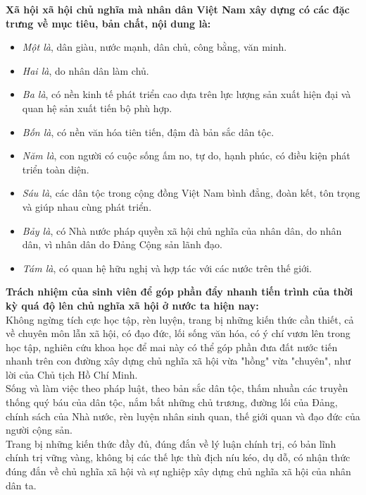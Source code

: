 \textbf{Xã hội xã hội chủ nghĩa mà nhân dân Việt Nam xây dựng có các đặc trưng về mục tiêu, bản chất, nội dung là:} \supercite{vk11}
\begin{itemize}
\item \textit{Một là}, dân giàu, nước mạnh, dân chủ, công bằng, văn minh.
\item \textit{Hai là}, do nhân dân làm chủ.
\item \textit{Ba là}, có nền kinh tế phát triển cao dựa trên lực lượng sản xuất hiện đại và quan hệ sản xuất tiến bộ phù hợp.
\item \textit{Bốn là}, có nền văn hóa tiên tiến, đậm đà bản sắc dân tộc.
\item \textit{Năm là}, con người có cuộc sống ấm no, tự do, hạnh phúc, có điều kiện phát triển toàn diện.
\item \textit{Sáu là}, các dân tộc trong cộng đồng Việt Nam bình đẳng, đoàn kết, tôn trọng và giúp nhau cùng phát triển.
\item \textit{Bảy là}, có Nhà nước pháp quyền xã hội chủ nghĩa của nhân dân, do nhân dân, vì nhân dân do Đảng Cộng sản lãnh đạo.
\item \textit{Tám là}, có quan hệ hữu nghị và hợp tác với các nước trên thế giới.
\end{itemize}
\textbf{Trách nhiệm của sinh viên để góp phần đẩy nhanh tiến trình của thời kỳ quá độ lên chủ nghĩa xã hội ở nước ta hiện nay:}\\
Không ngừng tích cực học tập, rèn luyện, trang bị những kiến thức cần thiết, cả về chuyên môn lẫn xã hội, có đạo đức, lối sống văn hóa, có ý chí vươn lên trong học tập, nghiên cứu khoa học để mai này có thể góp phần đưa đất nước tiến nhanh trên con đường xây dựng chủ nghĩa xã hội vừa "hồng" vừa "chuyên", như lời của Chủ tịch Hồ Chí Minh.\\
Sống và làm việc theo pháp luật, theo bản sắc dân tộc, thấm nhuần các truyền thống quý báu của dân tộc, nắm bắt những chủ trương, đường lối của Đảng, chính sách của Nhà nước, rèn luyện nhân sinh quan, thế giới quan và đạo đức của người cộng sản.\\
Trang bị những kiến thức đầy đủ, đúng đắn về lý luận chính trị, có bản lĩnh chính trị vững vàng, không bị các thế lực thù địch níu kéo, dụ dỗ, có nhận thức đúng đắn về chủ nghĩa xã hội và sự nghiệp xây dựng chủ nghĩa xã hội của nhân dân ta.
